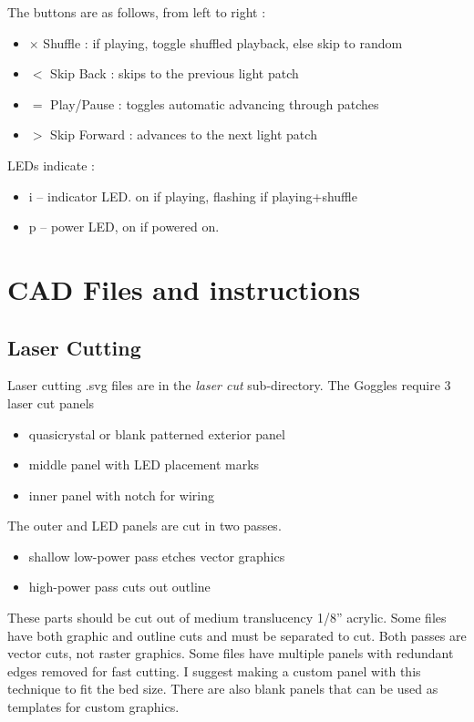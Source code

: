 \documentclass[11pt]{scrartcl}
\newenvironment{itemised}{
\begin{itemize}
  \setlength{\itemsep}{1pt}
  \setlength{\parskip}{0pt}
  \setlength{\parsep}{0pt}
}{\end{itemize}}
\begin{document}
The buttons are as follows, from left to right :
\begin{itemised}
\item[$\times$] Shuffle      : if playing, toggle shuffled playback, else skip to random
\item[$<$] Skip Back    : skips to the previous light patch
\item[$=$] Play/Pause   : toggles automatic advancing through patches
\item[$>$] Skip Forward : advances to the next light patch
\end{itemised}

LEDs indicate :
\begin{itemised}
\item[i] -- indicator LED. on if playing, flashing if playing+shuffle
\item[p] -- power LED, on if powered on. 
\end{itemised}
 

\newpage
\section{CAD Files and instructions}
\subsection{Laser Cutting}\noindent Laser cutting .svg files are in the \emph{laser cut} sub-directory. The Goggles require 3 laser cut panels
\begin{itemised}
\item quasicrystal or blank patterned exterior panel
\item middle panel with LED placement marks
\item inner panel with notch for wiring
\end{itemised}
The outer and LED panels are cut in two passes. 
\begin{itemised}
\item shallow low-power pass etches vector graphics
\item high-power pass cuts out outline
\end{itemised}
These parts should be cut out of medium translucency 1/8'' acrylic.
Some files have both graphic and outline cuts and must be separated to cut. 
Both passes are vector cuts, not raster graphics. 
Some files have multiple panels with redundant edges removed for fast cutting. 
I suggest making a custom panel with this technique to fit the bed size.
There are also blank panels that can be used as templates for custom graphics.
\end{document}
